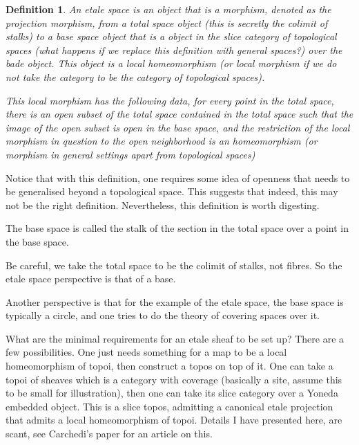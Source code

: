 \documentclass[12pt]{article}
\newtheorem{definition}{Definition}
\begin{document}
\begin{definition}
An etale space is an object that is a morphism, denoted as the projection morphism, from a total space object (this is secretly the colimit of stalks) to a base space object that is a object in the slice category of topological spaces (what happens if we replace this definition with general spaces?) over the bade object. This object is a local homeomorphism (or local morphism if we do not take the category to be the category of topological spaces).

This local morphism has the following data, for every point in the total space, there is an open subset of the total space contained in the total space such that the image of the open subset is open in the base space, and the restriction of the local morphism in question to the open neighborhood is an homeomorphism (or morphism in general settings apart from topological spaces)
\end{definition}

Notice that with this definition, one requires some idea of openness that needs to be generalised beyond a topological space. This suggests that indeed, this may not be the right definition. Nevertheless, this definition is worth digesting.

The base space is called the stalk of the section in the total space over a point in the base space.

Be careful, we take the total space to be the colimit of stalks, not fibres. So the etale space perspective is that of a base.

Another perspective is that for the example of the etale space, the base space is typically a circle, and one tries to do the theory of covering spaces over it.

What are the minimal requirements for an etale sheaf to be set up? There are a few possibilities. One just needs something for a map to be a local homeomorphism of topoi, then construct a topos on top of it. One can take a topoi of sheaves which is a category with coverage (basically a site, assume this to be small for illustration), then one can take its slice category over a Yoneda embedded object. This is a slice topos, admitting a canonical etale projection that admits a local homeomorphism of topoi. Details I have presented here, are scant, see Carchedi's paper for an article on this. 
\end{document}
